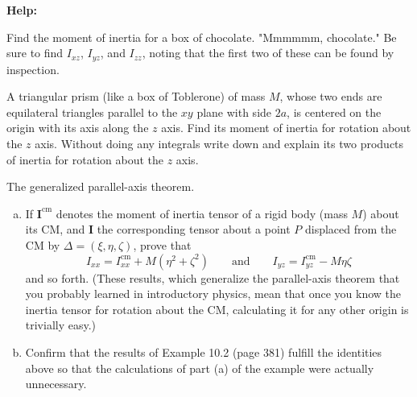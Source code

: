\documentclass[11pt,letterpaper,boxed]{../hmcpsetrhino}
\begin{document}
\textbf{Help:} 

\begin{problem}[i]
Find the moment of inertia for a box of chocolate. "Mmmmmm, chocolate." Be sure to find $I_{xz}$, $I_{yz}$, and $I_{zz}$, noting that the first two of these can be found by inspection.

\begin{problem}[10.12]
A triangular prism (like a box of Toblerone) of mass $M$, whose two ends are equilateral triangles parallel to the $xy$ plane with side $2a$, is centered on the origin with its axis along the $z$ axis. Find its moment of inertia for rotation about the $z$ axis. Without doing any integrals write down and explain its two products of inertia for rotation about the $z$ axis.

\end{problem}
\end{problem}
\begin{solution}
\vfill
\end{solution}

\newpage 

\begin{problem}[ii]
The generalized parallel-axis theorem.

\begin{problem}[10.24]
\begin{enumerate}[(a)]
\item If $\mathbf{I}^{\text{cm}}$ denotes the moment of inertia tensor of a rigid body (mass $M$) about its CM, and $\mathbf{I}$ the corresponding tensor about a point $P$ displaced from the CM by $\Delta = (\xi, \eta, \zeta)$, prove that 
\[	I_{xx} = I_{xx}^{\text{cm}} + M(\eta^2 + \zeta^2) \qquad \text{and} \qquad I_{yz} = I_{yz}^{\text{cm}} - M \eta \zeta\]
and so forth. (These results, which generalize the parallel-axis theorem that you probably learned in introductory physics, mean that once you know the inertia tensor for rotation about the CM, calculating it for any other origin is trivially easy.)

\item Confirm that the results of Example 10.2 (page 381) fulfill the identities above so that the calculations of part (a) of the example were actually unnecessary.
\end{enumerate}

\end{problem}
\end{problem}
\begin{solution}
\vfill
\end{solution}
\end{document}
